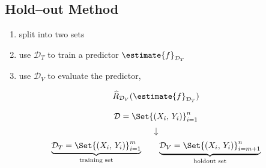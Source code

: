 \documentclass[18pt,a3paper,landscape, ncols=3]{cheatsheet}
\begin{document}
		\subsection{Hold--out Method}
			\begin{mdframed}
				\begin{minipage}{0.4\linewidth}
					\begin{enumerate}[leftmargin=*]
						\item split into two sets
						\item use \(\mathcal{D}_{T}\) to train a predictor \(\estimate{f}_{\mathcal{D}_{T}}\)
						\item use \(\mathcal{D}_{V}\) to evaluate the predictor,
					\end{enumerate}
					\[
						\widehat{R}_{\mathcal{D}_{V}}(\estimate{f}_{\mathcal{D}_{T}})
					\]
				\end{minipage}%
				\hfill\vrule\hfill%
				\begin{minipage}{0.50\linewidth}
					\[
						\mathcal{D} = \Set{(X_i,\, Y_i)}_{i=1}^{n}
					\]
					\[
						\downarrow
					\]
					\[
						\underbrace{\mathcal{D}_{T} = \Set{(X_i,\, Y_i)}_{i=1}^{m}}_{\text{training set}}
						\qquad
						\underbrace{\mathcal{D}_{V} = \Set{(X_i,\, Y_i)}_{i=m+1}^{n}}_{\text{holdout set}}
					\]
				\end{minipage}
			\end{mdframed}
\end{document}
